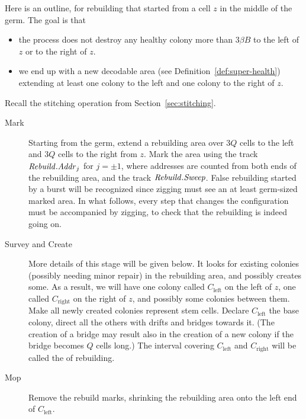 \documentclass[11pt]{memoir}
\theoremstyle{definition} %
\newcommand{\fld}[1]{\ensuremath{\textit{#1\/}}}
\def\B{B}
\newcommand{\Q}{Q}
\newcommand{\Addr}{\fld{Addr}}
\newcommand{\Rebuild}{\fld{Rebuild}}
\newcommand{\Sweep}{\fld{Sweep}}
\newcommand{\Left}{\text{left}}
\newcommand{\Right}{\text{right}}
\begin{document}
Here is an outline, for rebuilding that started from a cell \( z \) in the middle
of the germ.
The goal is that
\begin{itemize}
\item the process does not destroy any healthy colony more than
  \( 3\beta\B \) to the left of \( z \) or to the right of \( z \).
\item we end up with a new decodable area
  (see Definition~\ref{def:super-health}) extending at least one colony to the
  left and one colony to the right of \( z \).
\end{itemize}
Recall the stitching operation from Section~\ref{sec:stitching}.
\begin{description}
 \item[Mark] Starting from the germ, extend a rebuilding area  over \( 3\Q \) cells to the left 
and \( 3\Q \) cells to the right from \( z \).
Mark the area using the track \( \Rebuild.\Addr_{j} \) for \( j=\pm 1 \),
where addresses are counted from both 
ends of the rebuilding area, and the track \( \Rebuild.\Sweep \).
False rebuilding started by a burst will be recognized since
zigging must see an at least germ-sized marked area.
In what follows, every step that changes the configuration must be accompanied by zigging, to check that
the rebuilding is indeed going on.

 \item[Survey and Create]
More details of this stage will be given below.
It looks for existing colonies (possibly needing minor repair) in the rebuilding area, and 
possibly creates some.
As a result, we will have one colony called \( C_{\Left} \) 
on the left of \( z \), one called \( C_{\Right} \) on the right of \( z \),
and possibly some colonies between them.
Make all newly created colonies represent stem cells.
Declare \( C_{\Left} \) the base colony, direct all the others
with drifts and bridges towards it.
(The creation of a bridge may result also in the creation of a new 
colony if the bridge becomes \( \Q \) cells long.)
The interval covering \( C_{\Left} \) and \( C_{\Right} \)
will be called the  of rebuilding.

\item[Mop] Remove the rebuild marks, shrinking the rebuilding area onto the left end of \( C_{\Left} \).
\end{description}
\end{document}
